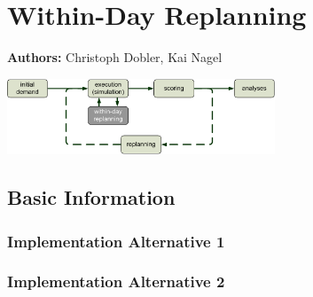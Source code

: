 \chapter{Within-Day Replanning}
\label{ch:withinday}

\hfill \textbf{Authors:} Christoph Dobler, Kai Nagel

\begin{center} \includegraphics[width=0.6\textwidth, angle=0]{extending/figures/WithinDayReplanning/WithinDayMATSimLoop} \end{center}


\section{Basic Information}
\label{sec:withinDay-stdInfo}
\subsection{Implementation Alternative 1}
\label{sec:withinDay1-stdInfo}


\subsection{Implementation Alternative 2}
\label{sec:withinDay2-stdInfo}

